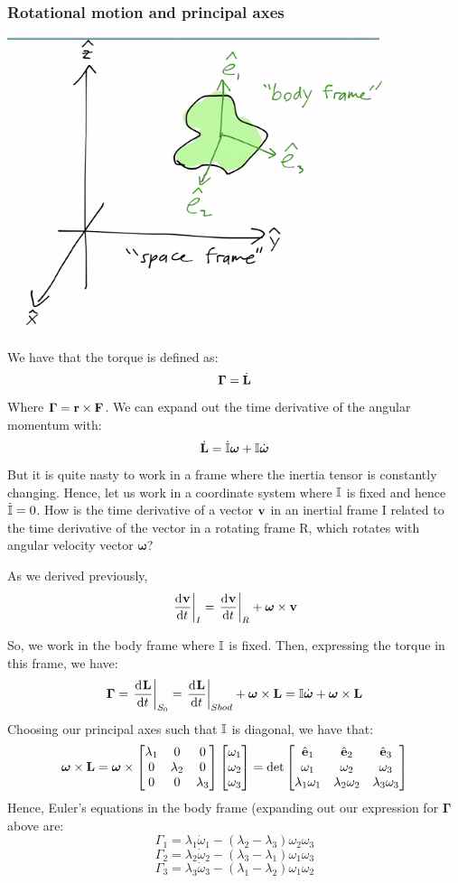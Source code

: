 \subsubsection{Rotational motion and principal axes}
\begin{center}
    \includegraphics[scale=1]{Lecture-19/l19-img1.png}
\end{center}
We have that the torque is defined as:
\[\bm{\Gamma} = \dot{\mathbf{L}}\]
Where $\bm{\Gamma} = \mathbf{r} \times \mathbf{F}$. We can expand out the time derivative of the angular momentum with:
\[\dot{\mathbf{L}} = \dot{\mathbb{I}}\bm{\omega} + \mathbb{I}\dot{\bm{\omega}}\]
But it is quite nasty to work in a frame where the inertia tensor is constantly changing. Hence, let us work in a coordinate system where $\mathbb{I}$ is fixed and hence $\dot{\mathbb{I}} = 0$. 
\newline How is the time derivative of a vector $\mathbf{v}$ in an inertial frame I related to the time derivative of the vector in a rotating frame R, which rotates with angular velocity vector $\bm{\omega}$?
\begin{s}
As we derived previously,
\[\left.\dod{\v{v}}{t}\right|_I = \left.\dod{\v{v}}{t}\right|_R + \bm{\omega} \times \v{v}\]
\end{s}
So, we work in the body frame where $\mathbb{I}$ is fixed. Then, expressing the torque in this frame, we have:
\[\bm{\Gamma} = \left.\dod{\v{L}}{t}\right|_{S_0} = \left.\dod{\v{L}}{t}\right|_{Sbod} + \bm{\omega} \times \v{L} = \II\dot{\bm{\omega}} + \bm{\omega} \times \v{L}\]
Choosing our principal axes such that $\mathbb{I}$ is diagonal, we have that:
\[\bm{\omega} \times \mathbf{L} = \bm{\omega} \times \begin{bmatrix}\lambda_1 & 0 & 0 \\ 0 & \lambda_2 & 0 \\ 0 & 0 & \lambda_3\end{bmatrix}\begin{bmatrix}\omega_1 \\ \omega_2 \\ \omega_3\end{bmatrix} = \det\begin{bmatrix}\hat{\mathbf{e}}_1 & \hat{\mathbf{e}}_2 & \hat{\mathbf{e}}_3 \\ \omega_1 & \omega_2 & \omega_3 \\ \lambda_1\omega_1 & \lambda_2\omega_2 & \lambda_3\omega_3 \end{bmatrix}\]
Hence, Euler's equations in the body frame (expanding out our expression for $\bm{\Gamma}$ above are:
\[\Gamma_1 = \lambda_1\dot{\omega}_1 - (\lambda_2 - \lambda_3)\omega_2\omega_3\]
\[\Gamma_2 = \lambda_2\dot{\omega}_2 - (\lambda_3 - \lambda_1)\omega_1\omega_3\]
\[\Gamma_3 = \lambda_3\dot{\omega}_3 - (\lambda_1 - \lambda_2)\omega_1\omega_2\]

